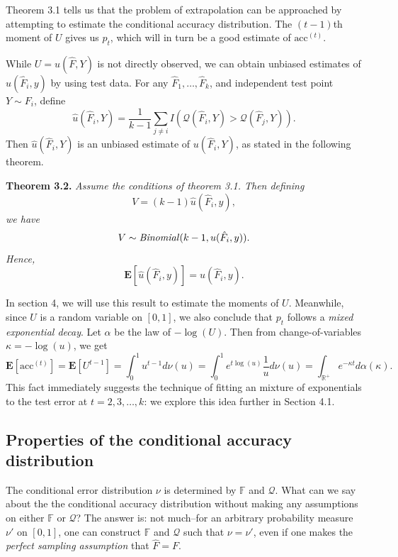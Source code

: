 \documentclass{article}
\newcommand{\E}{\textbf{E}}
\begin{document}
Theorem 3.1 tells us that the problem of extrapolation can be
approached by attempting to estimate the conditional accuracy
distribution.  The $(t-1)$th moment of $U$ gives us $p_t$, which will
in turn be a good estimate of $\text{acc}^{(t)}$.

While $U = u(\hat{F}, Y)$ is not directly observed, we can obtain unbiased estimates of $u(\hat{F}_i, y)$
by using test data.  For any $\hat{F}_1,\hdots, \hat{F}_k$, and independent test point $Y \sim F_i$, define
\begin{equation}\label{eq:hatu}
\hat{u}(\hat{F}_i, Y) = \frac{1}{k -1}\sum_{j \neq i} I(\mathcal{Q}(\hat{F}_i, Y) > \mathcal{Q}(\hat{F}_j, Y)).
\end{equation}
Then $\hat{u}(\hat{F}_i, Y)$ is an unbiased estimate of $u(\hat{F}_i, Y)$, as stated in the following theorem.

\noindent\textbf{Theorem 3.2.}\emph{
Assume the conditions of theorem 3.1.
Then defining 
\begin{equation}\label{eq:veq}
V = (k-1)\hat{u}(\hat{F}_i, y),\end{equation}
we have
\[V \sim \text{\emph{Binomial}}(k-1, u(\hat{F}_i, y)).\]
Hence,
\[\E[\hat{u}(\hat{F}_i, y)] = u(\hat{F}_i, y).\]
}

In section 4, we will use this result to estimate the moments of $U$.
Meanwhile, since $U$ is a random variable on $[0, 1]$, we also conclude that $p_t$ follows a \emph{mixed exponential decay}.
Let $\alpha$ be the law of $-\log(U)$.
Then from change-of-variables $\kappa =-\log(u)$, we get
\[\E[\text{acc}^{(t)}] = \E[U^{t-1}] = 
\int_0^1 u^{t-1} d\nu(u) = \int_0^1 e^{t\log(u)} \frac{1}{u}d\nu(u) = 
\int_{\mathbb{R}^{+}} e^{-\kappa t} d\alpha(\kappa).\]
This fact immediately suggests the technique of fitting an mixture of exponentials to the test error at $t =2,3,\hdots, k$:
we explore this idea further in Section 4.1.

\subsection{Properties of the conditional accuracy distribution}

The conditional error distribution $\nu$ is determined by $\mathbb{F}$
and $\mathcal{Q}$.  What can we say about the the conditional accuracy
distribution without making any assumptions on either $\mathbb{F}$ or
$\mathcal{Q}$?  The answer is: not much--for an arbitrary probability
measure $\nu'$ on $[0,1]$, one can construct $\mathbb{F}$ and
$\mathcal{Q}$ such that $\nu = \nu'$, even if one makes the \emph{perfect sampling assumption} that $\hat{F}=F.$
\end{document}
